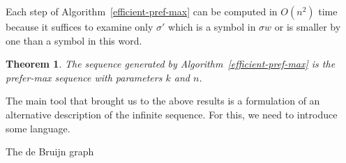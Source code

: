 \documentclass{article}
\newtheorem{theorem}{Theorem}
\theoremstyle{definition}
\begin{document}
Each step of Algorithm~\ref{efficient-pref-max} can be computed in $O(n^2)$ time because it suffices to examine only $\sigma'$ which is a symbol in $\sigma w$ or is smaller by one than a symbol in this word.

\begin{theorem}
	The sequence generated by Algorithm~\ref{efficient-pref-max} is the prefer-max sequence with parameters $k$ and $n$.
\end{theorem}
	

The main tool that brought us to the above results is a formulation of an alternative description of the infinite sequence. For this, we need to introduce some language.

The de Bruijn graph 

	
\end{document}
